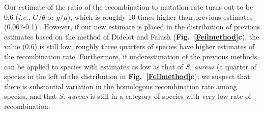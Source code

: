 \documentclass[twoside,twocolumn, letterpaper]{article}
\begin{document}
Our estimate of the ratio of the recombination to mutation rate turns out to be 0.6 (\emph{i.e.,} $G/\theta$ or $g/\mu$), which is roughly 10 times higher than previous estimates (0.067-0.1) \cite[]{Feil_2003_12754228,Vos_2009_18830278}. However, if our new estimate is placed in the distribution of previous estimates based on the method of Didelot and Falush \cite[]{Didelot_2007_17151252} ({\bf Fig.~\ref{Feilmethod}c}), the value (0.6) is still low; roughly three quarters of species have higher estimates of the recombination rate. Furthermore, if underestimation of the previous methods can be applied to species with estimates as low as that of \emph{S. aureus} (a quarter of species in the left of the distribution in {\bf Fig.~\ref{Feilmethod}c}), we suspect that there is substantial variation in the homologous recombination rate among species, and that \emph{S. aureus} is still in a category of species with very low rate of recombination. 
\end{document}
